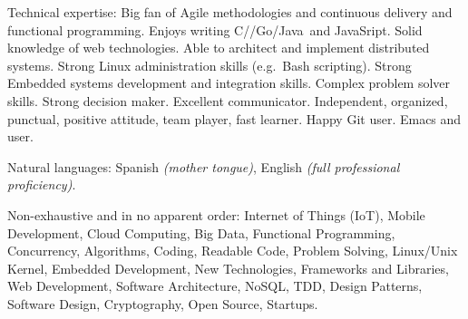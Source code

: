 \documentclass[10pt,a4paper]{article}
\begin{document}
\spacedhrule{0.5em}{-0.4em}


\inlineheadsection  %
  {Technical expertise:}
  {Big fan of Agile methodologies and continuous delivery and functional
    programming. Enjoys writing C/\nsp \CPP/\nsp Go/\nsp Java~and JavaSript.
    Solid knowledge of web technologies. Able to architect and implement
    distributed systems. Strong Linux administration skills (e.g.\ Bash
    scripting). Strong Embedded systems development and integration skills.
    Complex problem solver skills. Strong decision maker. Excellent
    communicator. Independent, organized, punctual, positive attitude, team
    player, fast learner. Happy Git user. Emacs and  user.}

\vspace{0.5em}
\inlineheadsection
  {Natural languages:}
  {Spanish \emph{(mother tongue)}, English \emph{(full professional proficiency)}.}


\spacedhrule{1.6em}{-0.4em}


\inlineheadsection
  {Non-exhaustive and in no apparent order:}
  {Internet of Things (IoT), Mobile Development, Cloud Computing, Big Data,
    Functional Programming, Concurrency, Algorithms, Coding, Readable Code,
    Problem Solving, Linux/Unix Kernel, Embedded Development, New Technologies,
    Frameworks and Libraries, Web Development, Software Architecture, NoSQL,
    TDD, Design Patterns, Software Design, Cryptography, Open Source, Startups.}
\end{document}
